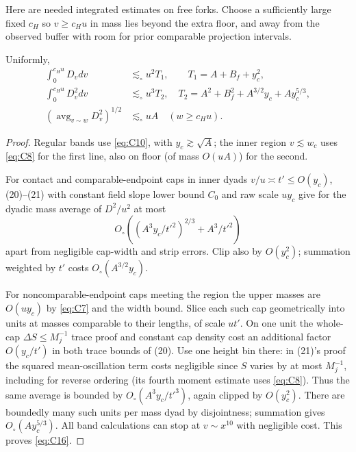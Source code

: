 Here are needed integrated estimates on free forks. Choose a sufficiently large fixed \(c_H\) so \(v\ge c_Hu\) in mass lies beyond the extra floor, and away from the observed buffer with room for prior comparable projection intervals. \begin{lemma}\label{bud:free-forks}
Uniformly,
\[
\begin{split}
 \int_0^{c_Hu}D_v dv&\lesssim_\circ u^2 T_1,\qquad T_1=A+B_f+y_c^2,\\
 \int_0^{c_Hu}D_v^2dv&\lesssim_\circ u^3 T_2,\quad
 T_2=A^2+B_f^2+A^{3/2}y_c+A y_c^{5/3},\\
 (\operatorname{avg}_{v\sim w}D_v^2)^{1/2}&\lesssim_\circ u A
                   \quad (w\ge c_Hu).
\end{split}                                                          \tag{C16}\label{eq:C16}
\]

\end{lemma}\begin{proof}

Regular bands use \eqref{eq:C10}, with \(y_c\gtrsim\sqrt A\); the inner region \(v\lesssim w_c\) uses \eqref{eq:C8} for the first line, also on floor (of mass \(O(u A)\)) for the second.

For contact and comparable-endpoint caps in inner dyads \(v/u\asymp t'\le O(y_c)\), (20)--(21) with constant field slope lower bound \(C_0\) and raw scale \(u y_c\) give for the dyadic mass average of \(D^2/u^2\) at most
\[
 O_\circ((A^3 y_c/t'^2)^{2/3}+A^3/t'^2)
\]
apart from negligible cap-width and strip errors. Clip also by \(O(y_c^2)\); summation weighted by \(t'\) costs \(O_\circ(A^{3/2}y_c)\).

For noncomparable-endpoint caps meeting the region the upper masses are \(O(u y_c)\) by \eqref{eq:C7} and the width bound. Slice each such cap geometrically into units at masses comparable to their lengths, of scale \(u t'\). On one unit the whole-cap \(\Delta S\le M_j^{-1}\) trace proof and constant cap density cost an additional factor \(O(y_c/t')\) in both trace bounds of (20). Use one height bin there: in (21)'s proof the squared mean-oscillation term costs negligible since \(S\) varies by at most \(M_j^{-1}\), including for reverse ordering (its fourth moment estimate uses \eqref{eq:C8}). Thus the same average is bounded by \(O_\circ(A^3 y_c/t'^3)\), again clipped by \(O(y_c^2)\). There are boundedly many such units per mass dyad by disjointness; summation gives \(O_\circ(A y_c^{5/3})\). All band calculations can stop at \(v\sim x^{10}\) with negligible cost. This proves \eqref{eq:C16}.


\end{proof}

